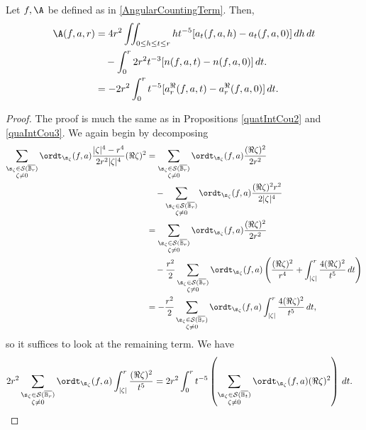 \documentclass{amsart}
\begin{document}
\begin{prop}
    Let $f, \A$ be defined as in \ref{AngularCountingTerm}. Then, \begin{align*}
        \A(f,a,r)&=4r^2\iint_{0\leq h\leq t\leq r} ht^{-5}[a_t(f,a,h)-a_t(f,a,0)]\, dh\, dt \\&\quad - \int_0^r 2r^2t^{-3}[n(f,a,t)-n(f,a,0)]\,dt. \\
        &= -2r^2\int_0^rt^{-5}[a_r^\Re(f,a,t)-a_r^\Re(f,a,0)]\,dt.  \\
    \end{align*}
\end{prop}
\begin{proof}
    The proof is much the same as in Propositions \ref{quatIntCou2} and \ref{quaIntCou3}. We again begin by decomposing \begin{align}\label{quaIntCou4.1}\sum_{\substack{ \s_\zeta\in\mathcal{S}(\overline{\mathbb B_r}) \\ \zeta\neq 0}}\ordt_{\s_\zeta}(f,a) \frac{|\zeta|^4-r^4}{2r^2|\zeta|^4}(\Re \zeta)^2 
    &=\sum_{\substack{ \s_\zeta\in\mathcal{S}(\overline{\mathbb B_r}) \\ \zeta\neq 0}}\ordt_{\s_\zeta}(f,a)\frac{(\Re \zeta)^2}{2r^2} \nonumber\\
    &\quad- \sum_{\substack{ \s_\zeta\in\mathcal{S}(\overline{\mathbb B_r}) \\ \zeta\neq 0}}\ordt_{\s_\zeta}(f,a)\frac{(\Re \zeta)^2r^2}{2|\zeta|^4} \nonumber\\
    &= \sum_{\substack{ \s_\zeta\in\mathcal{S}(\overline{\mathbb B_r}) \\ \zeta\neq 0}}\ordt_{\s_\zeta}(f,a)\frac{(\Re \zeta)^2}{2r^2} \nonumber\\
    &\quad- \frac{r^2}{2}\sum_{\substack{ \s_\zeta\in\mathcal{S}(\overline{\mathbb B_r}) \\ \zeta\neq 0}}\ordt_{\s_\zeta}(f,a)\left(\frac{(\Re \zeta)^2}{r^4}+\int_{|\zeta|}^r\frac{4(\Re \zeta)^2}{t^5}\,dt\right) \nonumber\\
    &=-\frac{r^2}{2}\sum_{\substack{ \s_\zeta\in\mathcal{S}(\overline{\mathbb B_r}) \\ \zeta\neq 0}}\ordt_{\s_\zeta}(f,a)\int_{|\zeta|}^r\frac{4(\Re \zeta)^2}{t^5}\,dt, 
    \end{align}
so it suffices to look at the remaining term. We have \begin{align}\label{quaIntCout4.3}
    2r^2\sum_{\substack{ \s_\zeta\in\mathcal{S}(\overline{\mathbb B_r}) \\ \zeta\neq 0}}\ordt_{\s_\zeta}(f,a)\int_{|\zeta|}^r\frac{(\Re \zeta)^2}{t^5} &= 2r^2\int_0^r t^{-5}\left(\sum_{\substack{ \s_\zeta\in\mathcal{S}(\overline{\mathbb B_t}) \\ \zeta\neq 0}}\ordt_{\s_\zeta}(f,a)(\Re \zeta)^2\right) \, dt.

\end{align}
\end{proof}
\end{document}
